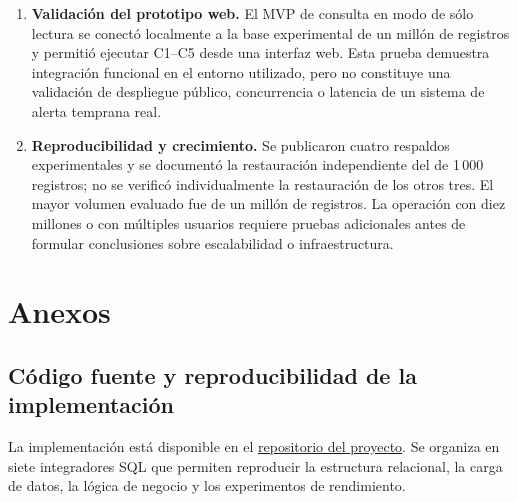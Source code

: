 \documentclass[12pt,a4paper]{article}
\begin{document}
\begin{enumerate}[leftmargin=*,label=\arabic*.,itemsep=0.65em,parsep=0pt]
    \item \textbf{Validación del prototipo web.} El MVP de consulta en modo de sólo lectura se conectó localmente a la base experimental de un millón de registros y permitió ejecutar C1--C5 desde una interfaz web. Esta prueba demuestra integración funcional en el entorno utilizado, pero no constituye una validación de despliegue público, concurrencia o latencia de un sistema de alerta temprana real.

    \item \textbf{Reproducibilidad y crecimiento.} Se publicaron cuatro respaldos experimentales y se documentó la restauración independiente del de 1\,000 registros; no se verificó individualmente la restauración de los otros tres. El mayor volumen evaluado fue de un millón de registros. La operación con diez millones o con múltiples usuarios requiere pruebas adicionales antes de formular conclusiones sobre escalabilidad o infraestructura.
\end{enumerate}
\clearpage

\section{Anexos}

\subsection{Código fuente y reproducibilidad de la implementación}

La implementación está disponible en el
\href{https://github.com/FabricioNick/Sistema-Monitoreo-Sismologico}{repositorio del proyecto}.
Se organiza en siete integradores SQL que permiten reproducir la
estructura relacional, la carga de datos, la lógica de negocio y los
experimentos de rendimiento.
\end{document}
